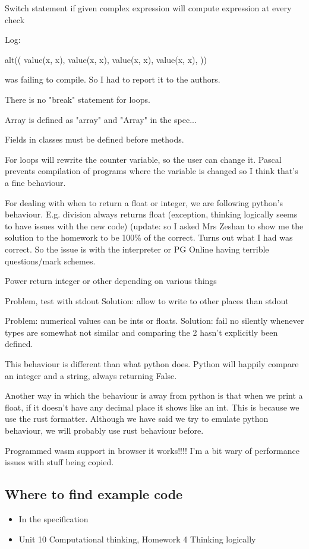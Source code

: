 \documentclass{article}
\begin{document}
Switch statement if given complex expression will compute expression at every
check

Log:


alt((
	value(x, x),
	value(x, x),
	value(x, x),
	value(x, x),
))

was failing to compile. So I had to report it to the authors.

There is no "break" statement for loops.

Array is defined as "array" and "Array" in the spec...

Fields in classes must be defined before methods.

For loops will rewrite the counter variable, so the user can change it.
Pascal prevents compilation of programs where the variable is changed so I
think that's a fine behaviour.

For dealing with when to return a float or integer, we are following python's
behaviour. E.g. division always returns float (exception, thinking logically
seems to have issues with the new code) (update: so I asked Mrs Zeshan to show
me the solution to the homework to be 100\% of the correct. Turns out what I
had was correct. So the issue is with the interpreter or PG Online having
terrible questions/mark schemes.

Power return integer or other depending on various things

Problem, test with stdout
Solution: allow to write to other places than stdout

Problem: numerical values can be ints or floats.
Solution: fail no silently whenever types are somewhat not similar and
comparing the 2 hasn't explicitly been defined.

This behaviour is different than what python does. Python will happily compare
an integer and a string, always returning False.

Another way in which the behaviour is away from python is that when we print a
float, if it doesn't have any decimal place it shows like an int. This is
because we use the rust formatter. Although we have said we try to emulate
python behaviour, we will probably use rust behaviour before.

Programmed wasm support in browser it works!!!! I'm a bit wary of performance
issues with stuff being copied.

\subsection{Where to find example code}

\begin{itemize}
	\item In the specification
	\item Unit 10 Computational thinking, Homework 4 Thinking logically
\end{itemize}

\printbibliography[heading=bibintoc]
\end{document}
